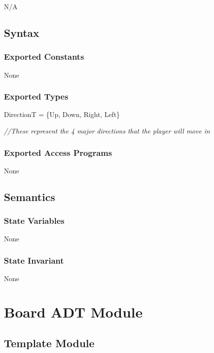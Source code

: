 \documentclass[12pt]{article}
\begin{document}
N/A

\subsection* {Syntax}

\subsubsection* {Exported Constants}

None

\subsubsection* {Exported Types}

DirectionT = \{Up, Down, Right, Left\}

\medskip

\noindent \textit{//These represent the 4 major directions that the player will move in}

\subsubsection* {Exported Access Programs}

None

\subsection* {Semantics}

\subsubsection* {State Variables}

None

\subsubsection* {State Invariant}

None

\newpage

\section* {Board ADT Module}

\subsection*{Template Module}
\end{document}
